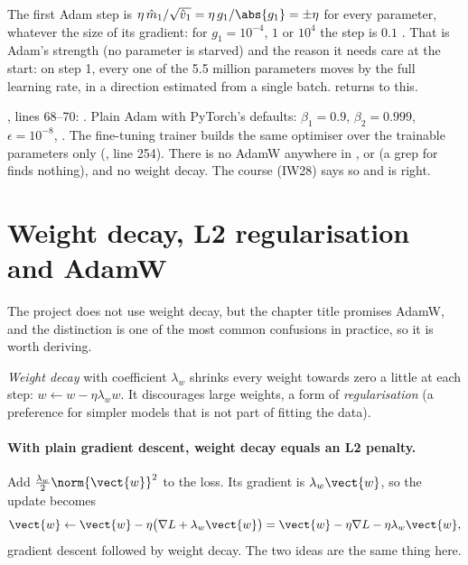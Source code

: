 The first Adam step is $\eta\,\hat{m}_1/\sqrt{\hat{v}_1} = \eta\,g_1/\abs{g_1} = \pm\eta$ for
every parameter, whatever the size of its gradient: for $g_1 = 10^{-4}$, $1$ or $10^4$ the step is
$0.1$ \tagC. That is Adam's strength (no parameter is starved) and the reason it needs care at
the start: on step 1, every one of the 5.5 million parameters moves by the full learning rate,
in a direction estimated from a single batch.  returns to this.

\begin{sourcenote}
, lines 68--70:
. Plain
Adam with PyTorch's defaults: $\beta_1 = 0.9$, $\beta_2 = 0.999$, $\epsilon = 10^{-8}$,
. The fine-tuning trainer builds the same optimiser over the trainable
parameters only (, line 254). There is
no AdamW anywhere in ,  or  (a grep for
 finds nothing), and no weight decay. The course (IW28) says so and is right.
\end{sourcenote}

\section{Weight decay, L2 regularisation and AdamW}\label{sec:trainloop:decay}

The project does not use weight decay, but the chapter title promises AdamW, and the
distinction is one of the most common confusions in practice, so it is worth deriving.

\begin{definition}
\emph{Weight decay} with coefficient $\lambda_w$ shrinks every weight towards zero a little at
each step: $w \leftarrow w - \eta\lambda_w w$. It discourages large weights, a form of
\emph{regularisation} (a preference for simpler models that is not part of
fitting the data).
\end{definition}

\paragraph{With plain gradient descent, weight decay equals an L2 penalty.} Add $\frac{\lambda_w}{2}\norm{\vect{w}}^2$
to the loss. Its gradient is $\lambda_w\vect{w}$, so the update becomes
\[
\vect{w} \leftarrow \vect{w} - \eta\big(\nabla L + \lambda_w\vect{w}\big)
= \vect{w} - \eta\nabla L - \eta\lambda_w\vect{w},
\]
gradient descent followed by weight decay. The two ideas are the same thing here.

